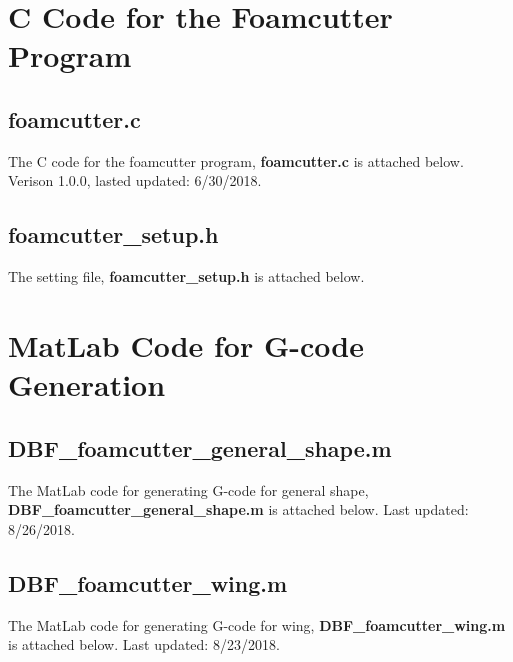 \documentclass[titlepage,12pt,letter]{report}
\numberwithin{equation}{chapter}
\begin{document}
\newpage
\begin{appendices}
\chapter{C Code for the Foamcutter Program}
\section{foamcutter.c}
The C code for the foamcutter program, \textbf{foamcutter.c} is attached below. Verison 1.0.0, lasted updated: 6/30/2018.


\section{foamcutter\_setup.h}
The setting file, \textbf{foamcutter\_setup.h} is attached below. 


\chapter{MatLab Code for G-code Generation}
\section{DBF\_foamcutter\_general\_shape.m}
The MatLab code for generating G-code for general shape, \\ \textbf{DBF\_foamcutter\_general\_shape.m} is attached below. Last updated: 8/26/2018.


\section{DBF\_foamcutter\_wing.m}
The MatLab code for generating G-code for wing, \textbf{DBF\_foamcutter\_wing.m} is attached below. Last updated: 8/23/2018.



\end{appendices}
\end{document}
